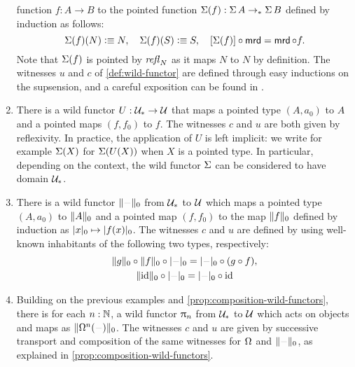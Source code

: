 \documentclass[english,a4]{article}
\def\githubpath{\tt\small}
\renewcommand{\ap}[1]{\left[{#1}\right]}
\newcommand{\ptdto}{\to_\ast}%
\newcommand{\setTrunc}[1]{\Trunc{#1}_0}
\newcommand{\settrunc}[1]{\trunc{#1}_0}
\newcommand{\UUptd}{\UU_{\ast}}
\begin{document}
\begin{example}
\begin{enumerate}
      function $f:A\to B$ to the pointed function $\susp (f) : \susp A \ptdto
      \susp B$ defined by induction as follows:
      \begin{displaymath}
        \susp (f) (N) \defequi N,\quad
        \susp (f) (S) \defequi S,\quad
        \ap{\susp (f)} \circ \mrd = \mrd \circ f.
      \end{displaymath}
      Note that $\operatorname{\Sigma} (f)$ is pointed by $\mathop{{\mathit{refl}}_{N}}$ as it maps $N$ to $N$
      by definition. The witnesses $u$ and $c$ of \cref{def:wild-functor} are
      defined through easy inductions on the supsension, and a
      careful exposition can be found in
      \cite[\githubpath core/lib/types/Suspension.agda]{hott-agda}.
    \item There is a wild functor $U:\UUptd \to \UU$ that maps a pointed type
      $(A,a_0)$ to $A$ and a pointed maps $(f,f_0)$ to $f$. The witnesses $c$
      and $u$ are both given by reflexivity. In practice, the application of $U$
      is left implicit: we write for example $\operatorname{\Sigma}(X)$ for $\operatorname{\Sigma} (U (X))$
      when $X$ is a pointed type. In particular, depending on the context, the
      wild functor $\operatorname{\Sigma}$ can be considered to have domain $\UUptd$.
    \item There is a wild functor $\setTrunc \blank$ from $\UUptd$ to $\mathcal{U}$
      which maps a pointed type $(A,a_0)$ to $\setTrunc{A}$ and a pointed map
      $(f,f_0)$ to the map $\setTrunc f$ defined by induction as $\settrunc x
      \mapsto \settrunc{f(x)}$. The witnesses $c$ and $u$ are defined
      by using well-known inhabitants of the following two types, respectively:
      \begin{gather*}
        \setTrunc g \circ \setTrunc f \circ \settrunc \blank = \settrunc \blank \circ (g\circ f),
        \\
        \setTrunc{\id} \circ \settrunc \blank = \settrunc \blank \circ \id
      \end{gather*}

    \item Building on the previous examples and
      \cref{prop:composition-wild-functors}, there is for each $n:\mathbb{N}$, a wild
      functor $\uppi_{n}$ from $\UUptd$ to $\mathcal{U}$ which acts on objects and maps as
      $\setTrunc{\loopspace n (\blank)}$. The witnesses $c$ and $u$ are given
      by successive transport and composition of the same witnesses for
      $\loopspace\null$ and $\setTrunc \blank$, 
      as explained in \cref{prop:composition-wild-functors}.
  \end{enumerate}
\end{example}
\end{document}
